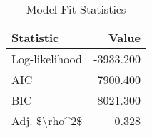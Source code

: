 \documentclass{article}
\begin{document}
\vspace{0.5cm}
\begin{table}[!h]
\centering
\caption{Model Fit Statistics}
\centering
\begin{tabular}[t]{lr}
\toprule
Statistic & Value\\
\midrule
Log-likelihood & -3933.200\\
AIC & 7900.400\\
BIC & 8021.300\\
Adj. \$\textbackslash{}rho\textasciicircum{}2\$ & 0.328\\
\bottomrule
\end{tabular}
\end{table}
\end{document}
